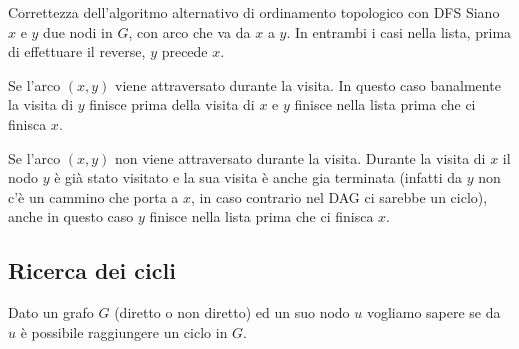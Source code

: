 \begin{Thm}{Correttezza dell'algoritmo alternativo di ordinamento topologico con DFS}{}
    Siano $x$ e $y$ due nodi in $G$, con arco che va da $x$ a $y$. In entrambi i casi nella lista, prima di effettuare il reverse, $y$ precede $x$. 
    \begin{demonstration}
        Se l'arco $(x, y)$ viene attraversato durante la visita. In questo caso banalmente la visita di $y$ finisce prima della visita di $x$ e $y$ finisce nella lista prima che ci finisca $x$.

        Se l'arco $(x, y)$ non viene attraversato durante la visita. Durante la visita di $x$ il nodo $y$ è già stato visitato e la sua visita è anche gia terminata (infatti da $y$ non c'è un cammino che porta a $x$, in caso contrario nel DAG ci sarebbe un ciclo), anche in questo caso $y$ finisce nella lista prima che ci finisca $x$.
    \end{demonstration}
\end{Thm}

\subsection{Ricerca dei cicli}
Dato un grafo $G$ (diretto o non diretto) ed un suo nodo $u$ vogliamo sapere se da $u$ è possibile raggiungere un ciclo in $G$.


